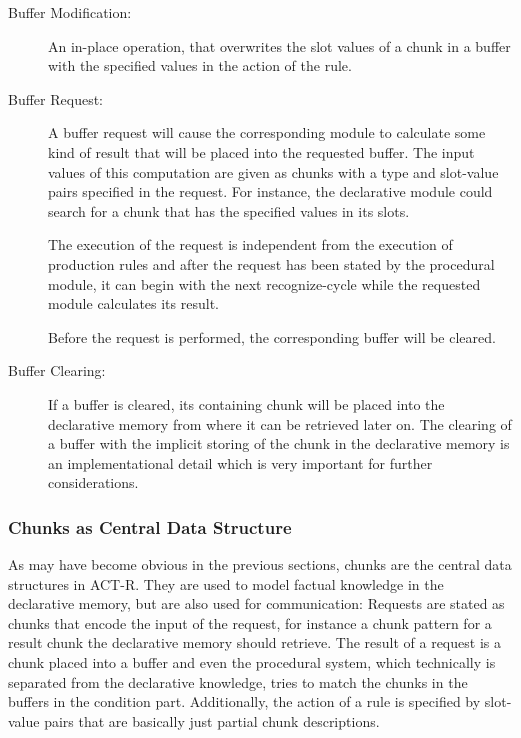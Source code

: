 \begin{description}
 \item[Buffer Modification:] 
 
 An in-place operation, that overwrites the slot values of a chunk in a buffer with the specified values in the action of the rule.
 
 \item[Buffer Request:] 
 
 A buffer request will cause the corresponding module to calculate some kind of result that will be placed into the requested buffer. The input values of this computation are given as chunks with a type and slot-value pairs specified in the request. For instance, the declarative module could search for a chunk that has the specified values in its slots.
 
 The execution of the request is independent from the execution of production rules and after the request has been stated by the procedural module, it can begin with the next recognize-cycle while the requested module calculates its result.
 
 Before the request is performed, the corresponding buffer will be cleared.
 
 \item[Buffer Clearing:] 
 
 If a buffer is cleared, its containing chunk will be placed into the declarative memory from where it can be retrieved later on. The clearing of a buffer with the implicit storing of the chunk in the declarative memory is an implementational detail which is very important for further considerations.
\end{description}

\subsubsection{Chunks as Central Data Structure}

As may have become obvious in the previous sections, chunks are the central data structures in ACT-R. They are used to model factual knowledge in the declarative memory, but are also used for communication: Requests are stated as chunks that encode the input of the request, for instance a chunk pattern for a result chunk the declarative memory should retrieve. The result of a request is a chunk placed into a buffer and even the procedural system, which technically is separated from the declarative knowledge, tries to match the chunks in the buffers in the condition part. Additionally, the action of a rule is specified by slot-value pairs that are basically just partial chunk descriptions. 

